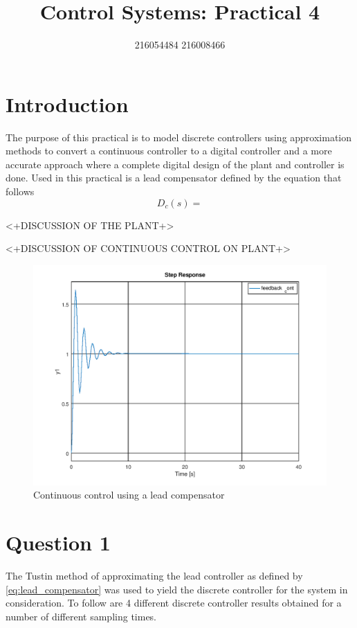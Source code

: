 \documentclass[a4paper, 12pt]{article}
\title{Control Systems: Practical 4}
\author{216054484 216008466}
\begin{document}
\maketitle
\newpage
{}
\tableofcontents
\listoffigures
\newpage
{}

\section{Introduction} %
\label{sec:introduction}
The purpose of this practical is to model discrete controllers using approximation methods to convert a continuous controller to a digital controller  and a more accurate approach where a complete digital design of the plant and controller is done. Used in this practical is a lead compensator defined by the equation that follows
\begin{equation}
	\label{eq:lead_compensator}
	D_c(s) = 
\end{equation}

<+DISCUSSION OF THE PLANT+>

<+DISCUSSION OF CONTINUOUS CONTROL ON PLANT+>
\begin{figure}[H]
  \centering
  \includegraphics[width=\textwidth]{img/continuous_control.png}
  \caption{Continuous control using a lead compensator}
  \label{fig:continuous_control}
\end{figure}

\section{Question 1} %
\label{sec:question_1}
The Tustin method of approximating the lead controller as defined by \eqref{eq:lead_compensator} was used to yield the discrete controller for the system in consideration. To follow are 4 different discrete controller results obtained for a number of different sampling times.
\end{document}
